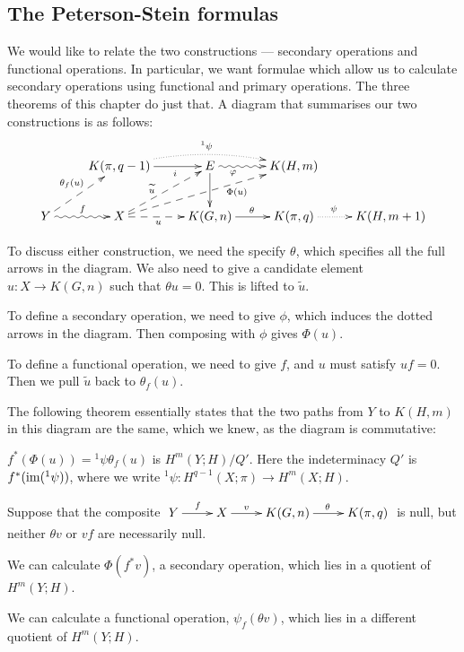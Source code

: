 \documentclass[11pt]{article}
\begin{document}
\subsection{The Peterson-Stein formulas}
We would like to relate the two constructions --- secondary operations and
functional operations. In particular, we want formulae which allow us to
calculate secondary operations using functional and primary operations. The
three theorems of this chapter do just that. A diagram that summarises our two
constructions is as follows:
\[\xymatrix{
&K(\pi,q-1)\ar[r]_{\ \ \ \ \ i}\ar@{.>}@/^.8pc/[rr]^{^1\psi}&
E\ar@{~>}[r]_{\phi\ \ \ \ \ \ \ \ \ }\ar[d]&K(H,m)\\
Y\ar@{~>}[r]^f\ar@{-->}[ru]^{\theta_f(u)}&
X\ar@{-->}[ru]^(.4){\widetilde u}
\ar@{-->}[r]_{u\ \ \ }\ar@{-->}[rru]_(.65){\Phi(u)}&
K(G,n)\ar[r]^\theta&K(\pi,q)\ar@{.>}[r]^{\psi\ \ \ \ }&
K(H,m+1)
}\]
\begin{itemise}
\item To discuss either construction, we need the specify $\theta$, which
specifies all the full arrows in the diagram. We also need to give a candidate
element $u:X\to K(G,n)$ such that $\theta u=0$. This is lifted to $\widetilde
u$.
\item To define a secondary operation, we need to give $\phi$, which induces the
dotted arrows in the diagram. Then composing with $\phi$ gives $\Phi(u)$.
\item To define a functional operation, we need to give $f$, and $u$ must
satisfy $u f=0$. Then we pull $\widetilde u$ back to $\theta_f(u)$.
\end{itemise}
The following theorem essentially states that the two paths from $Y$ to $K(H,m)$
in this diagram are the same, which we knew, as the diagram is commutative:
\begin{thm*}
$f^*(\Phi(u))={^1\psi}\theta_f(u)$ is $H^m(Y;H)/Q'$. Here the indeterminacy $Q'$
is $f^*(\operatorname{im}({^1\psi}))$, where we write $^1\psi:H^{q-1}(X;\pi)\to H^{m}(X;H)$.
\end{thm*}
Suppose that the composite
$\xymatrix{Y\ar[r]^f&X\ar[r]^{v\ \ \ \ } &K(G,n)\ar[r]^\theta&K(\pi,q)}$
is null, but neither $\theta v$ or $vf$ are necessarily null.
\begin{itemise}
\item We can calculate $\Phi(f^*v)$, a secondary operation, which lies in a
quotient of $H^m(Y;H)$.
\item We can calculate a functional operation, $\psi_f(\theta v)$, which lies in
a different quotient of $H^m(Y;H)$.
\end{itemise}
\end{document}
